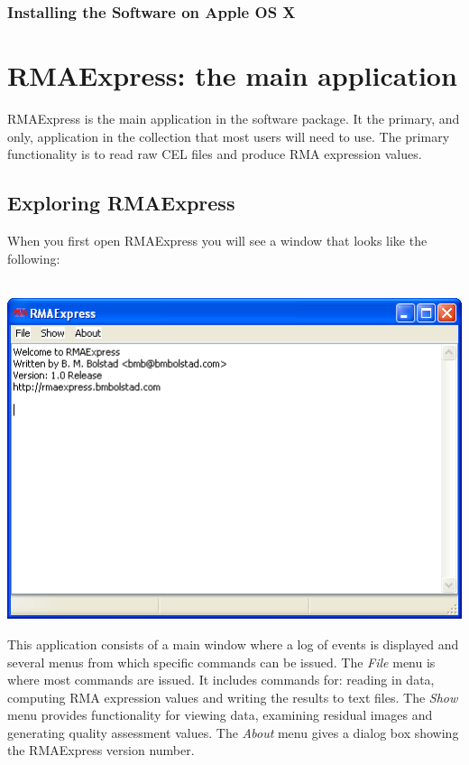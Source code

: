\documentclass[11pt]{report}
\begin{document}
\subsection{Installing the Software on Apple OS X}


\chapter{RMAExpress: the main application} \label{chap:RMAExpress}

RMAExpress is the main application in the software package. It the primary, and only, application in the collection that most users will need to use. The primary functionality is to read raw CEL files and produce RMA expression values. 

\section{Exploring RMAExpress}

When you first open RMAExpress you will see a window that looks like the following: \\ \\
\begin{center}
\includegraphics[scale=0.5]{mainwindow}
\end{center}

This application consists of a main window where a log of events is displayed and several menus from which specific commands can be issued. The {\it File} menu is where most commands are issued. It includes commands for: reading in data, computing RMA expression values and writing the results to text files. The {\it Show} menu provides functionality for viewing data, examining residual images and generating quality assessment values. The {\it About} menu gives a dialog box showing the RMAExpress version number.
\end{document}
